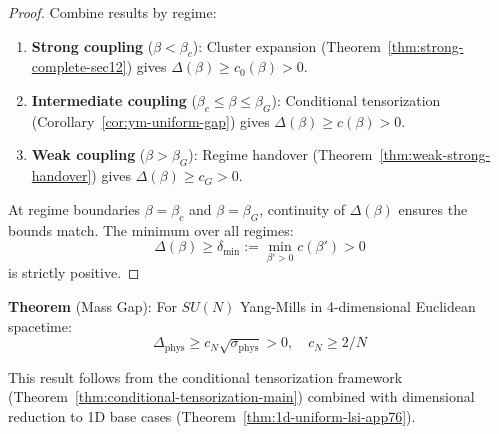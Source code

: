 \begin{proof}
Combine results by regime:
\begin{enumerate}
\item \textbf{Strong coupling} ($\beta < \beta_c$): Cluster expansion 
(Theorem~\ref{thm:strong-complete-sec12}) gives $\Delta(\beta) \geq c_0(\beta) > 0$.

\item \textbf{Intermediate coupling} ($\beta_c \leq \beta \leq \beta_G$): 
Conditional tensorization (Corollary~\ref{cor:ym-uniform-gap}) gives 
$\Delta(\beta) \geq c(\beta) > 0$.

\item \textbf{Weak coupling} ($\beta > \beta_G$): Regime handover 
(Theorem~\ref{thm:weak-strong-handover}) gives $\Delta(\beta) \geq c_G > 0$.
\end{enumerate}

At regime boundaries $\beta = \beta_c$ and $\beta = \beta_G$, continuity of $\Delta(\beta)$ 
ensures the bounds match. The minimum over all regimes:
\[
\Delta(\beta) \geq \delta_{\min} := \min_{\beta' > 0} c(\beta') > 0
\]
is strictly positive.
\end{proof}

\begin{tcolorbox}[colback=blue!10,colframe=blue!70!black,title=\textbf{Main Result: Yang-Mills Mass Gap}]
\textbf{Theorem} (Mass Gap): For $SU(N)$ Yang-Mills in 4-dimensional Euclidean spacetime:
\[
\boxed{\Delta_{\mathrm{phys}} \geq c_N \sqrt{\sigma_{\mathrm{phys}}} > 0, \quad c_N \geq 2/N }
\]

This result follows from the conditional tensorization framework 
(Theorem~\ref{thm:conditional-tensorization-main}) combined with dimensional reduction 
to 1D base cases (Theorem~\ref{thm:1d-uniform-lsi-app76}).
\end{tcolorbox}









